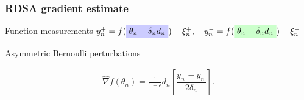 \begin{frame}
\begin{small}
\frametitle{\centering  RDSA gradient estimate}

\begin{block}{Function measurements}
$y_{n}^+ = f(\tikz[baseline]{\node[fill=blue!20,anchor=base] (tL) {$\theta_n+\delta_n d_n$};} ) + \xi_{n}^+,\quad y_{n}^- = f(\tikz[baseline]{\node[fill=green!20,anchor=base] (tL1) {$\theta_n-\delta_n d_n$};}) + \xi_{n}^-$
\end{block}
\pause
\begin{block}{Asymmetric Bernoulli perturbations}

\begin{align}
\label{eq:grad-unif}
\widehat\nabla f(\theta_n) = \frac{1}{1+\epsilon} d_n \left[ \dfrac{y_n^+ - y_n^-}{2\delta_n}\right].
\end{align}
\begin{center}
 \end{center}

 
\end{block}
\end{small}
\end{frame}


